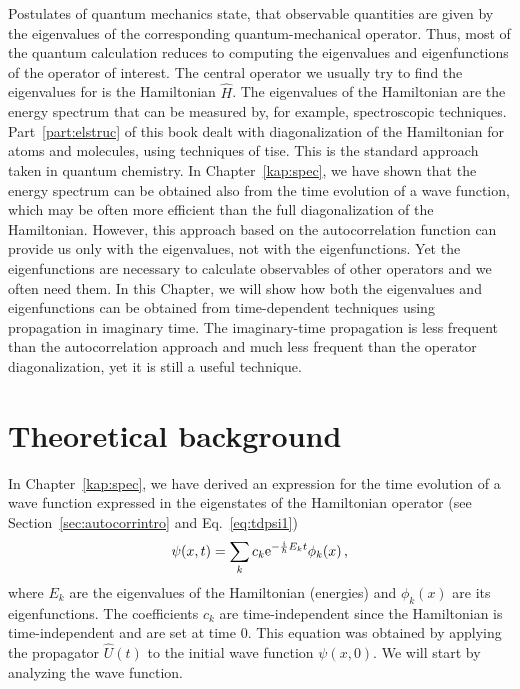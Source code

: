 Postulates of quantum mechanics state, that observable quantities are given by the eigenvalues of the corresponding quantum-mechanical operator. Thus, most of the quantum calculation reduces to computing the eigenvalues and eigenfunctions of the operator of interest. The central operator we usually try to find the eigenvalues for is the Hamiltonian $\hat{H}$. The eigenvalues of the Hamiltonian are the energy spectrum that can be measured by, for example, spectroscopic techniques. Part~\ref{part:elstruc} of this book dealt with diagonalization of the Hamiltonian for atoms and molecules, using techniques of \acrfull{tise}. This is the standard approach taken in quantum chemistry. In Chapter~\ref{kap:spec}, we have shown that the energy spectrum can be obtained also from the time evolution of a wave function, which may be often more efficient than the full diagonalization of the Hamiltonian. However, this approach based on the autocorrelation function can provide us only with the eigenvalues, not with the eigenfunctions. Yet the eigenfunctions are necessary to calculate observables of other operators and we often need them. In this Chapter, we will show how both the eigenvalues and eigenfunctions can be obtained from time-dependent techniques using propagation in imaginary time. The imaginary-time propagation is less frequent than the autocorrelation approach and much less frequent than the operator diagonalization, yet it is still a useful technique.

\section{Theoretical background}

In Chapter~\ref{kap:spec}, we have derived an expression for the time evolution of a wave function expressed in the eigenstates of the Hamiltonian operator (see Section~\ref{sec:autocorrintro} and Eq.~\eqref{eq:tdpsi1})
\begin{equation}
    \psi(x,t) = \sum_k c_k \mathrm{e}^{-\frac{i}{\hbar}E_k t}\phi_k(x) \, ,
    \label{eq:tdpsi2}
\end{equation}
where $E_k$ are the eigenvalues of the Hamiltonian (energies) and $\phi_k(x)$ are its eigenfunctions. The coefficients $c_k$ are time-independent since the Hamiltonian is time-independent and are set at time 0. This equation was obtained by applying the propagator $\hat{U}(t)$ to the initial wave function $\psi(x,0)$. We will start by analyzing the wave function.

